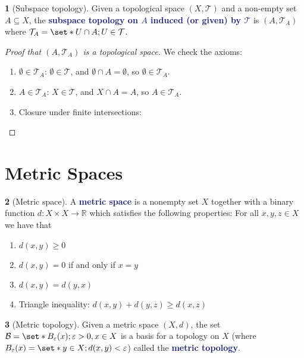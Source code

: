 \documentclass[11pt]{article}
\numberwithin{equation}{section}
\newcommand{\navy}[1]{\textcolor{MidnightBlue}{\bf #1}}
\theoremstyle{plain}
\theoremstyle{definition}
\newtheorem{definition}{\color{MidnightBlue}{\textbf{Definition}}}[section]
\def\Set{\set*}%
\def\sse{\subseteq}
\newcommand{\1}{\mathbbm 1}
\newcommand{\e}{\varepsilon}
\newcommand{\RR}{\mathbb R}
\newcommand{\tT}{\mathcal T}
\newcommand{\bB}{\mathcal B}
\begin{document}
\begin{definition}[Subspace topology]
	Given a topological space $(X,\tT)$ and a non-empty set $A \sse X$, the \navy{subspace topology on $A$ induced (or given) by $\tT$} is $(A, \tT_A)$ where $\tT_A = \Set{U \cap A; U \in \tT}$. 
\end{definition}

\begin{proof}[Proof that $(A, \tT_A)$ is a topological space]
	We check the axioms:
	\begin{enumerate}
		\item $\emptyset \in \tT_A$: $\emptyset \in \tT$, and $\emptyset \cap A = \emptyset$, so $\emptyset \in \tT_A$. 
		\item $A \in \tT_A$: $X \in \tT$, and $X \cap A = A$, so $A \in \tT_A$.  
		\item Closure under finite intersections: 
	\end{enumerate}
\end{proof}

\section{Metric Spaces}

\begin{definition}[Metric space]
	A \navy{metric space} is a nonempty set $X$ together with a binary function $d : X\times X \to \RR$ which satisfies the following properties: For all $x,y,z \in X$ we have that
	\begin{enumerate}
		\item $d(x,y) \geq 0$
		\item $d(x,y) = 0$ if and only if $x=y$
		\item $d(x,y) = d(y,x)$
		\item Triangle inequality: $d(x,y) + d(y,z) \geq d(x,z)$
	\end{enumerate}
\end{definition}

\begin{definition}[Metric topology]
	Given a metric space $(X,d)$, the set $\bB = \Set{B_\e(x); \e > 0, x \in X}$ is a basis for a topology on $X$ (where $B_\e(x) = \Set{y \in X; d(x,y) < \e}$) called the \navy{metric topology}.
\end{definition}





\end{document}
